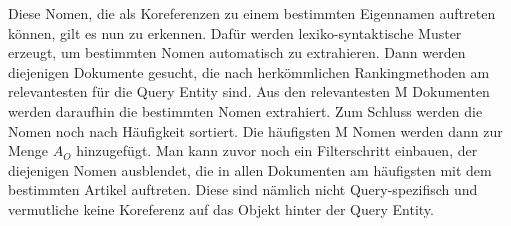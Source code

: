 Diese Nomen, die als Koreferenzen zu einem bestimmten Eigennamen auftreten können, gilt es nun zu erkennen. Dafür werden lexiko-syntaktische Muster erzeugt, um bestimmten Nomen automatisch zu extrahieren. Dann werden diejenigen Dokumente gesucht, die nach herkömmlichen Rankingmethoden am relevantesten für die Query Entity sind. Aus den relevantesten M Dokumenten werden daraufhin die bestimmten Nomen extrahiert. Zum Schluss werden die Nomen noch nach Häufigkeit sortiert. Die häufigsten M Nomen werden dann zur Menge $A_O$ hinzugefügt. Man kann zuvor noch ein Filterschritt einbauen, der diejenigen Nomen ausblendet, die in allen Dokumenten am häufigsten mit dem bestimmten Artikel auftreten. Diese sind nämlich nicht Query-spezifisch und vermutliche keine Koreferenz auf das Objekt hinter der Query Entity. 
